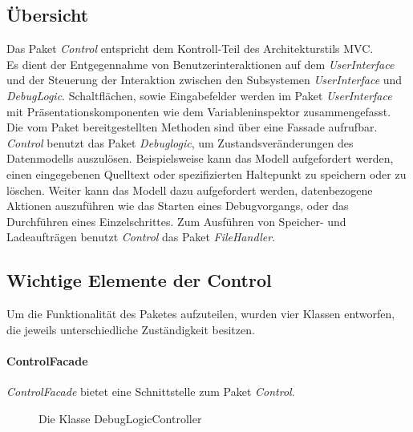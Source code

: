 \documentclass[parskip=full]{scrartcl}
\begin{document}
\subsection{Übersicht}
    Das Paket \textit{Control} entspricht dem Kontroll-Teil des Architekturstils MVC.\\
    Es dient der Entgegennahme von Benutzerinteraktionen auf dem \textit{UserInterface} und der Steuerung der Interaktion zwischen den Subsystemen \textit{UserInterface} und \textit{DebugLogic}.
    Schaltflächen, sowie Eingabefelder werden im Paket \textit{UserInterface} mit Präsentationskomponenten wie dem Variableninspektor zusammengefasst.\\
    Die vom Paket bereitgestellten Methoden sind über eine Fassade aufrufbar.\\
    \textit{Control} benutzt das Paket \textit{Debuglogic}, um Zustandsveränderungen des Datenmodells auszulösen.
    Beispielsweise kann das Modell aufgefordert werden, einen eingegebenen Quelltext oder spezifizierten Haltepunkt zu speichern oder zu löschen. 
    Weiter kann das Modell dazu aufgefordert werden, datenbezogene Aktionen auszuführen wie das Starten eines Debugvorgangs, oder das Durchführen eines Einzelschrittes. 
    Zum Ausführen von Speicher- und Ladeaufträgen benutzt \textit{Control} das Paket \textit{FileHandler}.
\subsection{Wichtige Elemente der Control}
    Um die Funktionalität des Paketes aufzuteilen, wurden vier Klassen entworfen, die jeweils unterschiedliche Zuständigkeit besitzen.
\paragraph{ControlFacade}
    \textit{ControlFacade} bietet eine Schnittstelle zum Paket \textit{Control}.

\begin{figure}[!h]
    \caption{Die Klasse DebugLogicController}
    \label{fig:DebugLogicController}
\end{figure}
\end{document}
